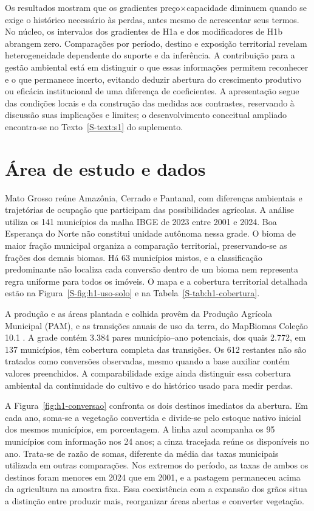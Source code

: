 Os resultados mostram que os gradientes preço×capacidade diminuem quando se exige o histórico necessário às perdas, antes mesmo de acrescentar seus termos. No núcleo, os intervalos dos gradientes de H1a e dos modificadores de H1b abrangem zero. Comparações por período, destino e exposição territorial revelam heterogeneidade dependente do suporte e da inferência. A contribuição para a gestão ambiental está em distinguir o que essas informações permitem reconhecer e o que permanece incerto, evitando deduzir abertura do crescimento produtivo ou eficácia institucional de uma diferença de coeficientes. A apresentação segue das condições locais e da construção das medidas aos contrastes, reservando à discussão suas implicações e limites; o desenvolvimento conceitual ampliado encontra-se no Texto~\ref{S-text:s1} do suplemento.

\section{Área de estudo e dados}
\label{sec:dados}

Mato Grosso reúne Amazônia, Cerrado e Pantanal, com diferenças ambientais e trajetórias de ocupação que participam das possibilidades agrícolas. A análise utiliza os 141 municípios da malha IBGE de 2023 entre 2001 e 2024. Boa Esperança do Norte não constitui unidade autônoma nessa grade. O bioma de maior fração municipal organiza a comparação territorial, preservando-se as frações dos demais biomas. Há 63 municípios mistos, e a classificação predominante não localiza cada conversão dentro de um bioma nem representa regra uniforme para todos os imóveis. O mapa e a cobertura territorial detalhada estão na Figura~\ref{S-fig:h1-uso-solo} e na Tabela~\ref{S-tab:h1-cobertura}.

A produção e as áreas plantada e colhida provêm da Produção Agrícola Municipal (PAM), e as transições anuais de uso da terra, do MapBiomas Coleção 10.1 \cite{IBGEPAM2026,MapBiomas2026}. A grade contém 3.384 pares município--ano potenciais, dos quais 2.772, em 137 municípios, têm cobertura completa das transições. Os 612 restantes não são tratados como conversões observadas, mesmo quando a base auxiliar contém valores preenchidos. A comparabilidade exige ainda distinguir essa cobertura ambiental da continuidade do cultivo e do histórico usado para medir perdas.

A Figura~\ref{fig:h1-conversao} confronta os dois destinos imediatos da abertura. Em cada ano, soma-se a vegetação convertida e divide-se pelo estoque nativo inicial dos mesmos municípios, em porcentagem. A linha azul acompanha os 95 municípios com informação nos 24 anos; a cinza tracejada reúne os disponíveis no ano. Trata-se de razão de somas, diferente da média das taxas municipais utilizada em outras comparações. Nos extremos do período, as taxas de ambos os destinos foram menores em 2024 que em 2001, e a pastagem permaneceu acima da agricultura na amostra fixa. Essa coexistência com a expansão dos grãos situa a distinção entre produzir mais, reorganizar áreas abertas e converter vegetação.


